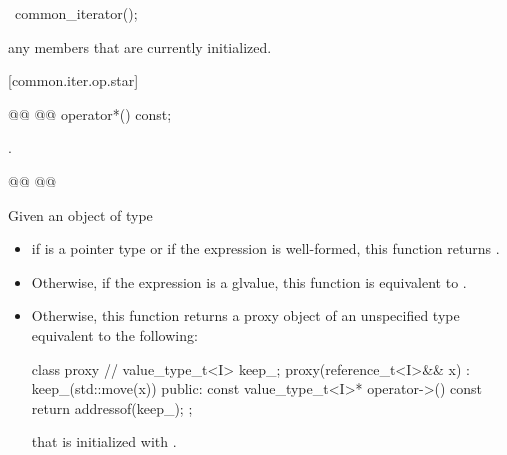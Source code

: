 \begin{addedblock}
\begin{itemdescr}
\pnum
\returns {}
\end{itemdescr}

%
\begin{itemdecl}
~common_iterator();
\end{itemdecl}

\begin{itemdescr}
\pnum
\effects
{} any members that are currently initialized.
\end{itemdescr}

[common.iter.op.star]{}

%
%
\begin{itemdecl}
@@
@@ operator*() const;
\end{itemdecl}

\begin{itemdescr}
\pnum
\requires {}

\pnum
\oldtxt{\returns}
 .
\end{itemdescr}

{\color{newclr}
%
%
\begin{itemdecl}
@\newtxt{\seebelow}@ @@
\end{itemdecl}

\begin{itemdescr}
\pnum
\requires {}

\pnum
\effects Given an object  of type 
\begin{itemize}
\item if  is a pointer type or if the expression
       is well-formed, this function returns
      .
\item Otherwise, if the expression  is a glvalue, this function
      is equivalent to .
\item Otherwise, this function returns a proxy object of an unspecified type
      equivalent to the following:
      \begin{codeblock}
      class proxy {               // \expos
        value_type_t<I> keep_;
        proxy(reference_t<I>&& x)
          : keep_(std::move(x)) {}
      public:
        const value_type_t<I>* operator->() const {
          return addressof(keep_);
        }
      };
      \end{codeblock}
      that is initialized with .
\end{itemize}
\end{itemdescr}
}


\end{addedblock}
